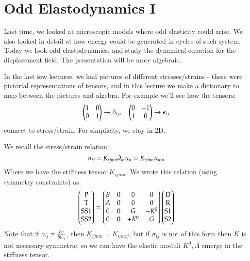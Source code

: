 \section{Odd Elastodynamics I}

Last time, we looked at microscopic models where odd elasticity could arise. We also looked in detail at how energy could be generated in cycles of such system. Today we look odd elastodynamics, and study the dynamical equation for the displacement field. The presentation will be more algebraic.

In the last few lectures, we had pictures of different stresses/strains - these were pictorial representations of tensors, and in this lecture we make a dictionary to map between the pictures and algebra. For example we'll see how the tensors:
\begin{equation}
    \begin{pmatrix}1 & 0 \\ 0 & 1\end{pmatrix} \to \delta_{ij}, \quad \begin{pmatrix}0 & -1 \\ 1 & 0\end{pmatrix} \to \epsilon_{ij}
\end{equation}
connect to stress/strain. For simplicity, we stay in 2D.

We recall the stress/strain relation:
\begin{equation}
    \sigma_{ij} = K_{ijmn}\partial_m u_n  = K_{ijmn}u_{mn}
\end{equation}
Where we have the stiffness tensor $K_{ijmn}$. We wrote this relation (using symmetry constraints) as:
\begin{equation}\label{eq:macroscopic}
    \begin{pmatrix}\text{P} \\ \text{T} \\ \text{SS1} \\ \text{SS2}\end{pmatrix} = \begin{pmatrix}B & 0 & 0 & 0 \\ A & 0 & 0 & 0 \\ 0 & 0 & G & -K^0 \\ 0 & 0 & +K^0 & G\end{pmatrix}\begin{pmatrix}\text{D} \\ \text{R} \\ \text{S1} \\ \text{S2}\end{pmatrix}
\end{equation}
Note that if $\sigma_{ij} = \frac{\delta \epsilon}{\delta u_{ij}}$, then $K_{ijmn} = K_{mnij}$, but if $\sigma_{ij}$ is not of this form then $K$ is not necessary symmetric, so we can have the elastic moduli $K^0, A$ emerge in the stiffness tensor.

